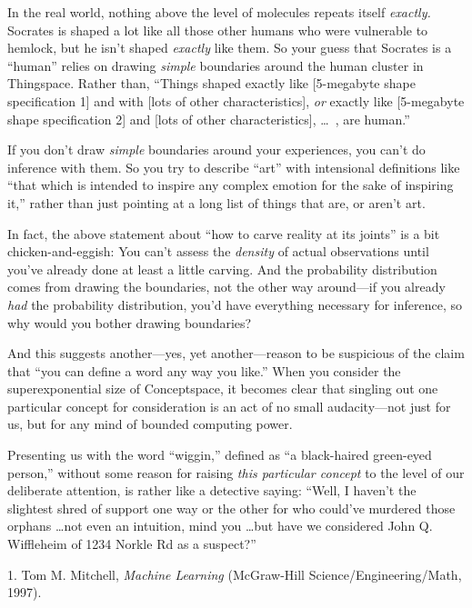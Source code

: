 {
 In the real world, nothing above the level of molecules repeats
itself \textit{exactly.} Socrates is shaped a lot like all those other
humans who were vulnerable to hemlock, but he isn't
shaped \textit{exactly} like them. So your guess that Socrates is a
``human'' relies on drawing
\textit{simple} boundaries around the human cluster in Thingspace.
Rather than, ``Things shaped exactly like [5-megabyte
shape specification 1] and with [lots of other characteristics],
\textit{or} exactly like [5-megabyte shape specification 2] and [lots
of other characteristics], \ldots~, are human.''}

{
 If you don't draw \textit{simple} boundaries
around your experiences, you can't do inference with
them. So you try to describe ``art''
with intensional definitions like ``that which is
intended to inspire any complex emotion for the sake of inspiring
it,'' rather than just pointing at a long list of
things that are, or aren't art.}

{
 In fact, the above statement about ``how to carve
reality at its joints'' is a bit chicken-and-eggish:
You can't assess the \textit{density} of actual
observations until you've already done at least a
little carving. And the probability distribution comes from drawing the
boundaries, not the other way around---if you already \textit{had} the
probability distribution, you'd have everything
necessary for inference, so why would you bother drawing boundaries?}

{
 And this suggests another---yes, yet another---reason to be
suspicious of the claim that ``you can define a word
any way you like.'' When you consider the
superexponential size of Conceptspace, it becomes clear that singling
out one particular concept for consideration is an act of no small
audacity---not just for us, but for any mind of bounded computing
power.}

{
 Presenting us with the word
``wiggin,'' defined as
``a black-haired green-eyed
person,'' without some reason for raising
\textit{this particular concept} to the level of our deliberate
attention, is rather like a detective saying: ``Well,
I haven't the slightest shred of support one way or the
other for who could've murdered those orphans \ldots not
even an intuition, mind you \ldots but have we considered John Q.
Wiffleheim of 1234 Norkle Rd as a suspect?''}

\myendsectiontext


\bigskip

{
 1. Tom M. Mitchell, \textit{Machine Learning} (McGraw-Hill
Science/Engineering/Math, 1997).}

